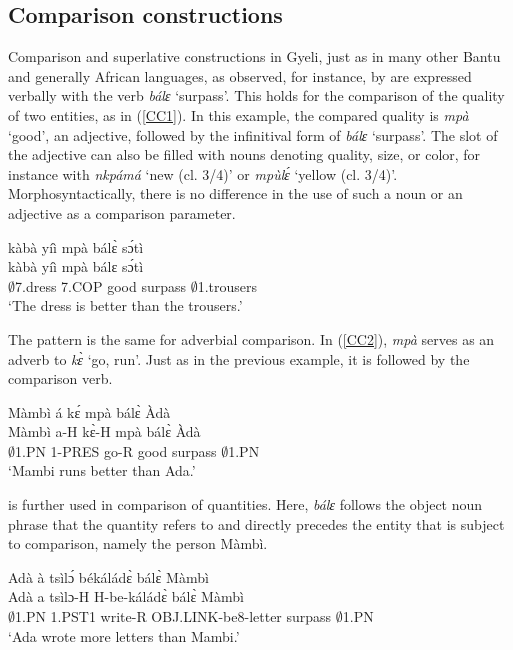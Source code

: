 \subsection{Comparison constructions}
\label{sec:CC}


Comparison and superlative constructions in Gyeli, just as in many other Bantu and generally African languages, as observed, for instance, by \citet[157]{stassen84} are expressed verbally with the verb {\itshape bálɛ} `surpass'. This holds for the comparison of the quality of two entities, as in (\ref{CC1}). In this example, the compared quality is {\itshape mpà} `good', an adjective, followed by the infinitival form of {\itshape bálɛ} `surpass'. The slot of the adjective can also be filled with nouns denoting quality, size, or color, for instance with {\itshape nkpámá} `new (cl. 3/4)' or {\itshape mpùlɛ́} `yellow (cl. 3/4)'. Morphosyntactically, there is no difference in the use of such a noun or an adjective as a comparison parameter.

\begin{exe} 
\ex\label{CC1}
  \glll kàbà yíì mpà bálɛ̀ sɔ́tì \\
        kàbà yíì mpà bálɛ sɔ́tì \\
       $\emptyset$7.dress 7.COP good surpass $\emptyset$1.trousers  \\
    \trans `The dress is better than the trousers.'
\end{exe}

The pattern is the same for adverbial comparison. In (\ref{CC2}), {\itshape mpà} serves as an adverb to {\itshape kɛ̀} `go, run'. Just as in the previous example, it is followed by the comparison verb.

\begin{exe} 
\ex\label{CC2}
  \glll Màmbì á kɛ́ mpà bálɛ̀ Àdà \\
        Màmbì a-H kɛ̀-H mpà bálɛ̀ Àdà \\
       $\emptyset$1.PN 1-PRES go-R good surpass $\emptyset$1.PN  \\
    \trans `Mambi runs better than Ada.'
\end{exe}

 is further used in comparison of quantities. Here, {\itshape bálɛ} follows the object noun phrase that the quantity refers to and directly precedes the entity that is subject to comparison, namely the person Màmbì.

\begin{exe} 
\ex\label{CC3}
  \glll Adà à tsìlɔ́ békáládɛ̀ bálɛ̀ Màmbì \\
        Adà a tsìlɔ-H H-be-káládɛ̀ bálɛ̀ Màmbì \\
       $\emptyset$1.PN 1.PST1 write-R OBJ.LINK-be8-letter surpass $\emptyset$1.PN  \\
    \trans `Ada wrote more letters than Mambi.'
\end{exe}

